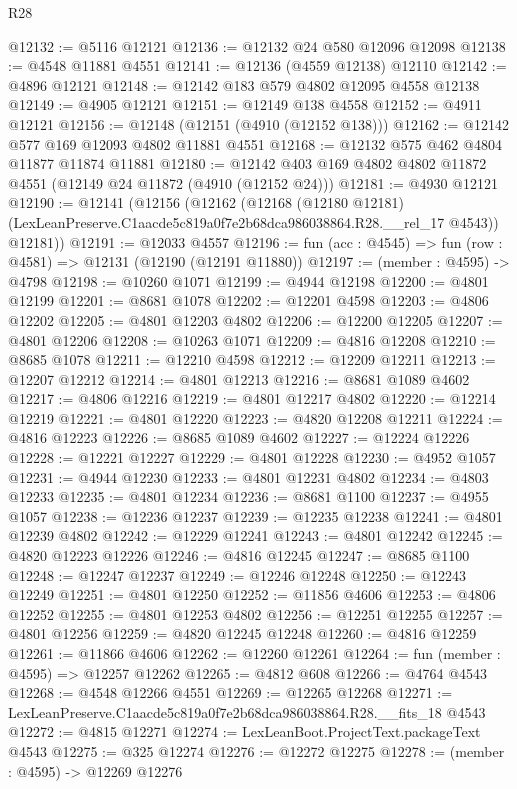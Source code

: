 \begin{lexlean}{R28}
\begin{coremodule}
@12132 := @5116 @12121
@12136 := @12132 @24 @580 @12096 @12098
@12138 := @4548 @11881 @4551
@12141 := @12136 (@4559 @12138) @12110
@12142 := @4896 @12121
@12148 := @12142 @183 @579 @4802 @12095 @4558 @12138
@12149 := @4905 @12121
@12151 := @12149 @138 @4558
@12152 := @4911 @12121
@12156 := @12148 (@12151 (@4910 (@12152 @138)))
@12162 := @12142 @577 @169 @12093 @4802 @11881 @4551
@12168 := @12132 @575 @462 @4804 @11877 @11874 @11881
@12180 := @12142 @403 @169 @4802 @4802 @11872 @4551 (@12149 @24 @11872 (@4910 (@12152 @24)))
@12181 := @4930 @12121
@12190 := @12141
    (@12156
      (@12162
        (@12168
          (@12180 @12181)
          (LexLeanPreserve.C1aacde5c819a0f7e2b68dca986038864.R28.__rel_17 @4543))
        @12181))
@12191 := @12033 @4557
@12196 := fun (acc : @4545) => fun (row : @4581) => @12131 (@12190 (@12191 @11880))
@12197 := (member : @4595) -> @4798
@12198 := @10260 @1071
@12199 := @4944 @12198
@12200 := @4801 @12199
@12201 := @8681 @1078
@12202 := @12201 @4598
@12203 := @4806 @12202
@12205 := @4801 @12203 @4802
@12206 := @12200 @12205
@12207 := @4801 @12206
@12208 := @10263 @1071
@12209 := @4816 @12208
@12210 := @8685 @1078
@12211 := @12210 @4598
@12212 := @12209 @12211
@12213 := @12207 @12212
@12214 := @4801 @12213
@12216 := @8681 @1089 @4602
@12217 := @4806 @12216
@12219 := @4801 @12217 @4802
@12220 := @12214 @12219
@12221 := @4801 @12220
@12223 := @4820 @12208 @12211
@12224 := @4816 @12223
@12226 := @8685 @1089 @4602
@12227 := @12224 @12226
@12228 := @12221 @12227
@12229 := @4801 @12228
@12230 := @4952 @1057
@12231 := @4944 @12230
@12233 := @4801 @12231 @4802
@12234 := @4803 @12233
@12235 := @4801 @12234
@12236 := @8681 @1100
@12237 := @4955 @1057
@12238 := @12236 @12237
@12239 := @12235 @12238
@12241 := @4801 @12239 @4802
@12242 := @12229 @12241
@12243 := @4801 @12242
@12245 := @4820 @12223 @12226
@12246 := @4816 @12245
@12247 := @8685 @1100
@12248 := @12247 @12237
@12249 := @12246 @12248
@12250 := @12243 @12249
@12251 := @4801 @12250
@12252 := @11856 @4606
@12253 := @4806 @12252
@12255 := @4801 @12253 @4802
@12256 := @12251 @12255
@12257 := @4801 @12256
@12259 := @4820 @12245 @12248
@12260 := @4816 @12259
@12261 := @11866 @4606
@12262 := @12260 @12261
@12264 := fun (member : @4595) => @12257 @12262
@12265 := @4812 @608
@12266 := @4764 @4543
@12268 := @4548 @12266 @4551
@12269 := @12265 @12268
@12271 := LexLeanPreserve.C1aacde5c819a0f7e2b68dca986038864.R28.__fits_18 @4543
@12272 := @4815 @12271
@12274 := LexLeanBoot.ProjectText.packageText @4543
@12275 := @325 @12274
@12276 := @12272 @12275
@12278 := (member : @4595) -> @12269 @12276

\end{coremodule}
\end{lexlean}
